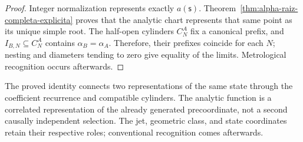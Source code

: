 \begin{proof}
Integer normalization represents exactly \(a(\mathsf s)\).
Theorem~\ref{thm:alpha-raiz-completa-explicita} proves that the analytic
chart represents that same point as its unique simple root. The
half-open cylinders \(C_N^A\) fix a canonical prefix, and
\(I_{B,N}\subseteq C_N^A\) contains \(\alpha_B=\alpha_A\). Therefore, their
prefixes coincide for each \(N\); nesting and diameters tending to
zero give equality of the limits. Metrological
recognition occurs afterwards.
\end{proof}

The proved identity connects two representations of the same state
through the coefficient recurrence and compatible cylinders.
The analytic function is a correlated representation of the already
generated precoordinate, not a second causally independent selection.
The jet, geometric class, and state coordinates retain their respective
roles; conventional recognition comes afterwards.
